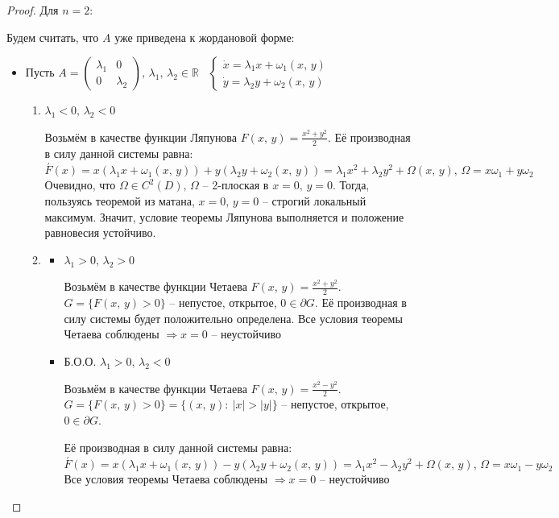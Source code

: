 \documentclass[a4paper,12pt]{article}
\theoremstyle{plain}
\theoremstyle{definition}
\theoremstyle{remark}
\begin{document}
\begin{proof}
	Для $n = 2$:

	Будем считать, что $A$ уже приведена к жордановой форме:

	\begin{itemize}
		\item Пусть $A = \begin{pmatrix}
				      \lambda_1 & 0         \\
				      0         & \lambda_2
			      \end{pmatrix},\, \lambda_1,\,\lambda_2 \in \mathbb{R}\;\;\;\begin{cases}
				      \dot{x} = \lambda_1x + \omega_1(x,\,y) \\
				      \dot{y} = \lambda_2y + \omega_2(x,\,y)
			      \end{cases}$
		      \begin{enumerate}
			      \item $\lambda_1 < 0,\, \lambda_2 < 0$

			            Возьмём в качестве функции Ляпунова $F(x,\,y) = \frac{x^2 + y^2}{2}$. Её производная в силу данной системы равна: \[\overset{'}{F}(x) = x(\lambda_1x + \omega_1(x,\,y)) + y(\lambda_2y + \omega_2(x,\,y)) = \lambda_1x^2 + \lambda_2y^2 + \Omega(x,\,y),\, \Omega = x\omega_1 + y\omega_2\]
			            Очевидно, что $\Omega \in C^2(D),\, \Omega$ -- 2-плоская в $x = 0,\, y = 0$. Тогда, пользуясь теоремой из матана, $x = 0,\, y = 0$ -- строгий локальный максимум. Значит, условие теоремы Ляпунова выполняется и положение равновесия устойчиво.

			      \item \begin{itemize}
				            \item $\lambda_1 > 0,\, \lambda_2 > 0$

				                  Возьмём в качестве функции Четаева $F(x,\,y) = \frac{x^2 + y^2}{2}$. $G = \{F(x,\,y) > 0\}$ -- непустое, открытое, $0 \in \partial G$. Её производная в силу системы будет положительно определена. Все условия теоремы Четаева соблюдены $\Rightarrow x = 0$ -- неустойчиво
				            \item Б.О.О. $\lambda_1 > 0,\, \lambda_2 < 0$

				                  Возьмём в качестве функции Четаева $F(x,\,y) = \frac{x^2 - y^2}{2}$. $G = \{F(x,\,y) > 0\} = \{(x,\,y):\: |x| > |y|\}$ -- непустое, открытое, $0 \in \partial G$.

				                  Её производная в силу данной системы равна: \[\overset{'}{F}(x) = x(\lambda_1x + \omega_1(x,\,y)) - y(\lambda_2y + \omega_2(x,\,y)) = \lambda_1x^2 - \lambda_2y^2 + \Omega(x,\,y),\, \Omega = x\omega_1 - y\omega_2\]
				                  Все условия теоремы Четаева соблюдены $\Rightarrow x = 0$ -- неустойчиво
			            \end{itemize}
		      \end{enumerate}


\end{itemize}
\end{proof}
\end{document}
